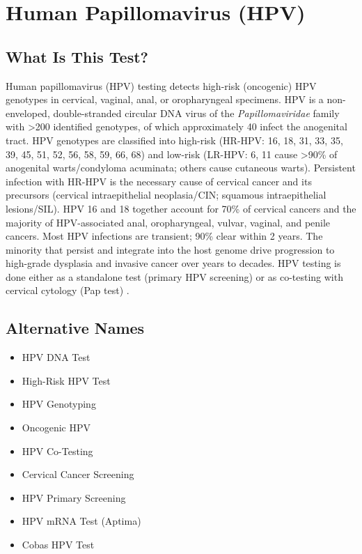 \chapter{Human Papillomavirus (HPV)}

\section*{What Is This Test?}
Human papillomavirus (HPV) testing detects high-risk (oncogenic) HPV genotypes in cervical, vaginal, anal, or oropharyngeal specimens. HPV is a non-enveloped, double-stranded circular DNA virus of the \textit{Papillomaviridae} family with >200 identified genotypes, of which approximately 40 infect the anogenital tract. HPV genotypes are classified into high-risk (HR-HPV: 16, 18, 31, 33, 35, 39, 45, 51, 52, 56, 58, 59, 66, 68) and low-risk (LR-HPV: 6, 11 cause >90\% of anogenital warts/condyloma acuminata; others cause cutaneous warts). Persistent infection with HR-HPV is the necessary cause of cervical cancer and its precursors (cervical intraepithelial neoplasia/CIN; squamous intraepithelial lesions/SIL). HPV 16 and 18 together account for 70\% of cervical cancers and the majority of HPV-associated anal, oropharyngeal, vulvar, vaginal, and penile cancers. Most HPV infections are transient; 90\% clear within 2 years. The minority that persist and integrate into the host genome drive progression to high-grade dysplasia and invasive cancer over years to decades. HPV testing is done either as a standalone test (primary HPV screening) or as co-testing with cervical cytology (Pap test) \cite{schiffman2016carcinogenic}.

\section*{Alternative Names}
\begin{itemize}
  \item HPV DNA Test
  \item High-Risk HPV Test
  \item HPV Genotyping
  \item Oncogenic HPV
  \item HPV Co-Testing
  \item Cervical Cancer Screening
  \item HPV Primary Screening
  \item HPV mRNA Test (Aptima)
  \item Cobas HPV Test
\end{itemize}
